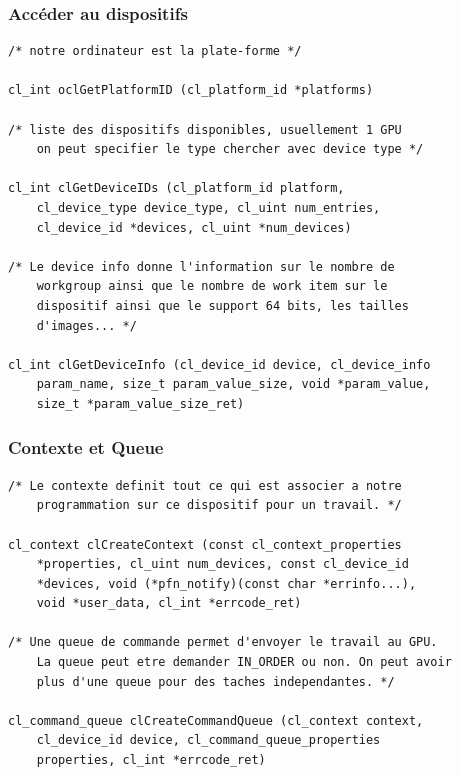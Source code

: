 \documentclass[oneside]{book}
\begin{document}
\subsubsection{Accéder au dispositifs}
\begin{lstlisting}
/* notre ordinateur est la plate-forme */

cl_int oclGetPlatformID (cl_platform_id *platforms)

/* liste des dispositifs disponibles, usuellement 1 GPU
	on peut specifier le type chercher avec device type */
	
cl_int clGetDeviceIDs (cl_platform_id platform,
	cl_device_type device_type, cl_uint num_entries,
	cl_device_id *devices, cl_uint *num_devices)
	
/* Le device info donne l'information sur le nombre de
	workgroup ainsi que le nombre de work item sur le
	dispositif ainsi que le support 64 bits, les tailles
	d'images... */
	
cl_int clGetDeviceInfo (cl_device_id device, cl_device_info
	param_name, size_t param_value_size, void *param_value,
	size_t *param_value_size_ret)
\end{lstlisting}

\subsubsection{Contexte et Queue}
\begin{lstlisting}
/* Le contexte definit tout ce qui est associer a notre
	programmation sur ce dispositif pour un travail. */
	
cl_context clCreateContext (const cl_context_properties
	*properties, cl_uint num_devices, const cl_device_id
	*devices, void (*pfn_notify)(const char *errinfo...),
	void *user_data, cl_int *errcode_ret)
	
/* Une queue de commande permet d'envoyer le travail au GPU.
	La queue peut etre demander IN_ORDER ou non. On peut avoir
	plus d'une queue pour des taches independantes. */
	
cl_command_queue clCreateCommandQueue (cl_context context,
	cl_device_id device, cl_command_queue_properties
	properties, cl_int *errcode_ret)
\end{lstlisting}
\end{document}
